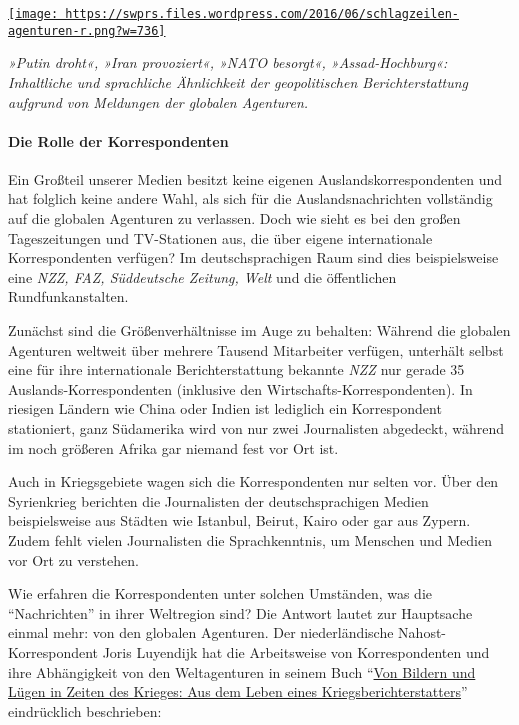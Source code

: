 \href{https://swprs.files.wordpress.com/2016/06/schlagzeilen-agenturen-r.png}{\texttt{[image: https://swprs.files.wordpress.com/2016/06/schlagzeilen-agenturen-r.png?w=736]}}

\emph{»Putin droht«, »Iran provoziert«, »NATO besorgt«,
»Assad-Hochburg«: Inhaltliche und sprachliche Ähnlichkeit der
geopolitischen Bericht­erstattung aufgrund von Meldungen der globalen
Agenturen.}

\hypertarget{die-rolle-der-korrespondenten}{%
\paragraph{Die Rolle der
Korrespondenten}\label{die-rolle-der-korrespondenten}}

Ein Großteil unserer Medien besitzt keine eigenen
Auslands­korrespondenten und hat folglich keine andere Wahl, als sich
für die Auslandsnachrichten vollständig auf die globalen Agenturen zu
verlassen. Doch wie sieht es bei den großen Tageszeitungen und
TV-Stationen aus, die über eigene internationale Korrespondenten
verfügen? Im deutschsprachigen Raum sind dies beispielsweise eine
\emph{NZZ, FAZ, Süddeutsche Zeitung, Welt} und die öffentlichen
Rundfunkanstalten.

Zunächst sind die Größen­verhältnisse im Auge zu behalten: Während die
globalen Agenturen weltweit über mehrere Tausend Mitarbeiter verfügen,
unterhält selbst eine für ihre internationale Berichterstattung bekannte
\emph{NZZ} nur gerade 35 Auslands-Korrespondenten (inklusive den
Wirtschafts-Korrespondenten). In riesigen Ländern wie China oder Indien
ist lediglich ein Korrespondent stationiert, ganz Südamerika wird von
nur zwei Journalisten abgedeckt, während im noch größeren Afrika gar
niemand fest vor Ort ist.

Auch in Kriegsgebiete wagen sich die Korrespondenten nur selten vor.
Über den Syrienkrieg berichten die Journalisten der deutsch­sprachigen
Medien beispielsweise aus Städten wie Istanbul, Beirut, Kairo oder gar
aus Zypern. Zudem fehlt vielen Journalisten die Sprachkenntnis, um
Menschen und Medien vor Ort zu verstehen.

Wie erfahren die Korrespondenten unter solchen Umständen, was die
``Nachrichten'' in ihrer Weltregion sind? Die Antwort lautet zur
Hauptsache einmal mehr: von den globalen Agenturen. Der niederländische
Nahost-Korrespondent Joris Luyendijk hat die Arbeitsweise von
Korrespondenten und ihre Abhängigkeit von den Weltagenturen in seinem
Buch
``\href{https://www.klett-cotta.de/buch/Tropen-Sachbuch/Von_Bildern_und_Luegen_in_Zeiten_des_Krieges/48944}{Von
Bildern und Lügen in Zeiten des Krieges: Aus dem Leben eines
Kriegsberichterstatters}'' eindrücklich beschrieben:

